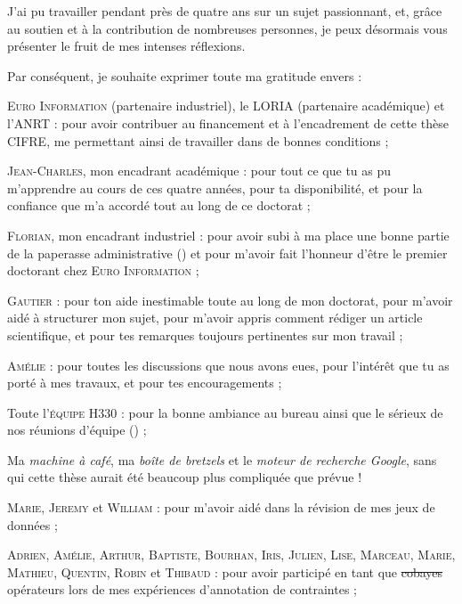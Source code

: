 \begin{ThesisAcknowledgments}

	J'ai pu travailler pendant près de quatre ans sur un sujet passionnant, et, grâce au soutien et à la contribution de nombreuses personnes, je peux désormais vous présenter le fruit de mes intenses réflexions.
	
	Par conséquent, je souhaite exprimer toute ma gratitude envers :
	\begin{todolist}
		\item[\itemok] \textsc{Euro Information} (partenaire industriel), le \textsc{LORIA} (partenaire académique) et l'\textsc{ANRT} :
		pour avoir contribuer au financement et à l’encadrement de cette thèse CIFRE, me permettant ainsi de travailler dans de bonnes conditions ;
		\item[\itemok] \textsc{Jean-Charles}, mon encadrant académique :
		pour tout ce que tu as pu m'apprendre au cours de ces quatre années, pour ta disponibilité, et pour la confiance que m'a accordé tout au long de ce doctorat ;
		\item[\itemok] \textsc{Florian}, mon encadrant industriel :
		pour avoir subi à ma place une bonne partie de la paperasse administrative (\faGrinTongueWink) et pour m'avoir fait l'honneur d'être le premier doctorant chez \textsc{Euro Information} ;
		\item[\itemok] \textsc{Gautier} :
		pour ton aide inestimable toute au long de mon doctorat, pour m'avoir aidé à structurer mon sujet, pour m'avoir appris comment rédiger un article scientifique, et pour tes remarques toujours pertinentes sur mon travail ;
		\item[\itemok] \textsc{Amélie} : pour toutes les discussions que nous avons eues, pour l’intérêt que tu as porté à mes travaux, et pour tes encouragements ;
		\item[\itemok] Toute l'\textsc{équipe H330} : pour la bonne ambiance au bureau ainsi que le sérieux de nos réunions d'équipe (\faGrinTongueWink) ;
		\item[\itemok] Ma \textit{machine à café}, ma \textit{boîte de bretzels} et le \textit{moteur de recherche Google}, sans qui cette thèse aurait été beaucoup plus compliquée que prévue ! \faGrinBeamSweat
		\item[\itemok] \textsc{Marie}, \textsc{Jeremy} et \textsc{William} : pour m'avoir aidé dans la révision de mes jeux de données ;
		\item[\itemok] \textsc{Adrien}, \textsc{Amélie}, \textsc{Arthur}, \textsc{Baptiste}, \textsc{Bourhan}, \textsc{Iris}, \textsc{Julien}, \textsc{Lise}, \textsc{Marceau}, \textsc{Marie}, \textsc{Mathieu}, \textsc{Quentin}, \textsc{Robin} et \textsc{Thibaud} : pour avoir participé en tant que \st{cobayes} opérateurs lors de mes expériences d'annotation de contraintes ; 

\end{todolist}
\end{ThesisAcknowledgments}
